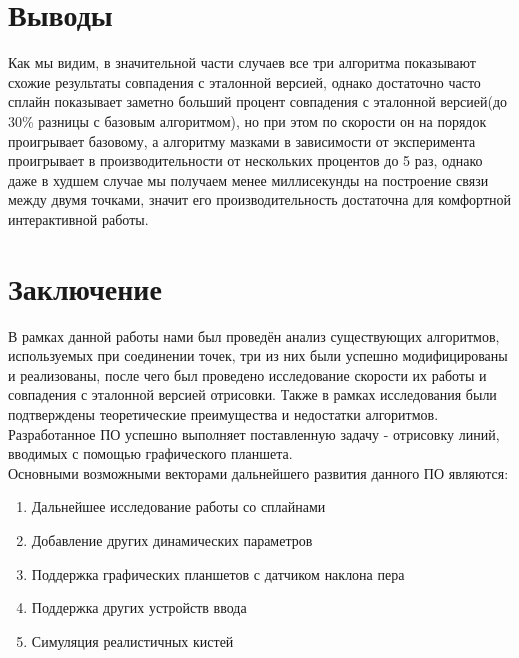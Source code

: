 \section{Выводы}
Как мы видим, в значительной части случаев все три алгоритма показывают схожие результаты совпадения с эталонной версией, однако достаточно часто сплайн показывает заметно больший процент совпадения с эталонной версией(до 30\% разницы с базовым алгоритмом), но при этом по скорости он на порядок проигрывает базовому, а алгоритму мазками в зависимости от эксперимента проигрывает в производительности от нескольких процентов до 5 раз, однако даже в худшем случае мы получаем менее миллисекунды на построение связи между двумя точками, значит его производительность достаточна для комфортной интерактивной работы. 


\section{Заключение}
В рамках данной работы нами был проведён анализ существующих алгоритмов, используемых при соединении точек, три из них были успешно модифицированы и реализованы, после чего был проведено исследование скорости их работы и совпадения с эталонной версией отрисовки. Также в рамках исследования были подтверждены теоретические преимущества и недостатки алгоритмов. Разработанное ПО успешно выполняет поставленную задачу - отрисовку линий, вводимых с помощью графического планшета.\\
Основными возможными векторами дальнейшего развития данного ПО являются: 
\begin{enumerate}
	\item	Дальнейшее исследование работы со сплайнами
	\item	Добавление других динамических параметров
	\item	Поддержка графических планшетов с датчиком наклона пера
	\item	Поддержка других устройств ввода
	\item	Симуляция реалистичных кистей
\end{enumerate}



